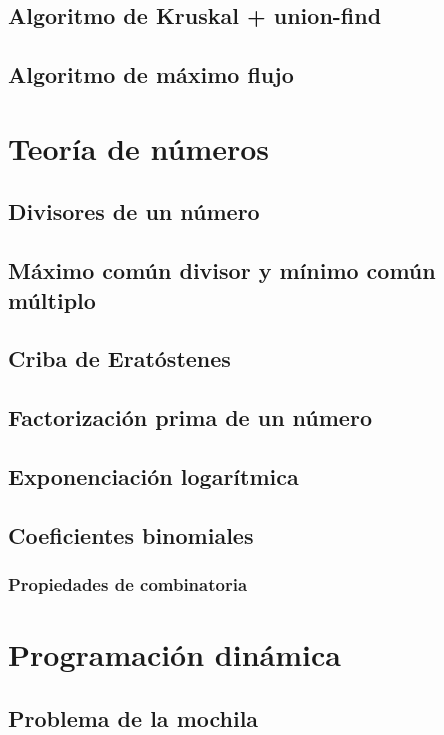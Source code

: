 \documentclass[10pt,letterpaper,twocolumn]{article}
\begin{document}
	\subsection{Algoritmo de Kruskal + union-find}
	
	\subsection{Algoritmo de máximo flujo}
	
	
\section{Teoría de números}
	\subsection{Divisores de un número}
	
	\subsection{Máximo común divisor y mínimo común múltiplo}
	
	\subsection{Criba de Eratóstenes}
	
	\subsection{Factorización prima de un número}
	
	\subsection{Exponenciación logarítmica}
	
	\subsection{Coeficientes binomiales}
		
		\subsubsection{Propiedades de combinatoria}
	
\section{Programación dinámica}
	\subsection{Problema de la mochila}
	
\end{document}
